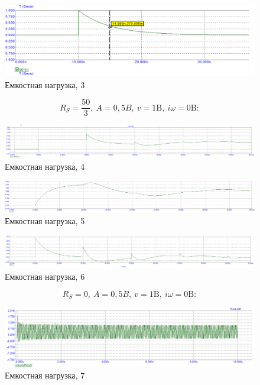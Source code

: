 \documentclass[a4paper, 14pt]{extarticle}%
\begin{document}
\begin{figure}[h!]
			\centering
			\includegraphics[width=1.1\linewidth]{./graphs/22.jpg}
			\caption{Емкостная нагрузка, 3}
			\label{5.3}
\end{figure}

\[ R_{S}=\frac{50}{3},\ A=0,5 B,\ v=1 \text{B},\  i \omega=0 \text{B}:\]

\newpage

\begin{figure}[h!]
			\centering
			\includegraphics[width=1.1\linewidth]{./graphs/23.jpg}
			\caption{Емкостная нагрузка, 4}
			\label{5.4}
\end{figure}

\begin{figure}[h!]
			\centering
			\includegraphics[width=1.1\linewidth]{./graphs/24.jpg}
			\caption{Емкостная нагрузка, 5}
			\label{5.5}
\end{figure}

\begin{figure}[h!]
			\centering
			\includegraphics[width=1.1\linewidth]{./graphs/25.jpg}
			\caption{Емкостная нагрузка, 6}
			\label{5.6}
\end{figure}

\[ R_{S}=0,\ A=0,5 B,\ v=1 \text{B},\  i \omega=0 \text{B}:\]

\begin{figure}[h!]
			\centering
			\includegraphics[width=1.1\linewidth]{./graphs/26.jpg}
			\caption{Емкостная нагрузка, 7}
			\label{5.7}
\end{figure}
\end{document}
